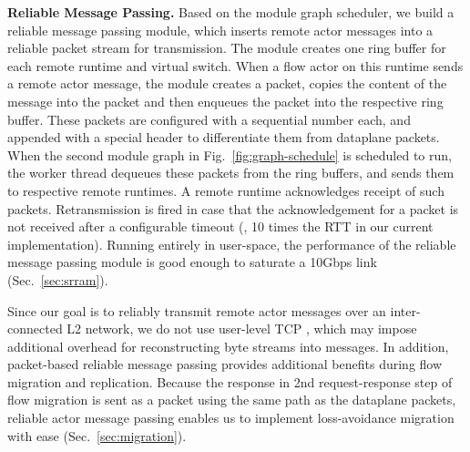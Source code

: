 \noindent \textbf{Reliable Message Passing.} Based on the module graph scheduler, we build a reliable message passing module, which inserts remote actor messages into a reliable packet stream for transmission. The module creates one ring buffer for each remote runtime and virtual switch. When a flow actor on this runtime sends a remote actor message, the module creates a packet, copies the content of the message into the packet and then enqueues the packet into the respective ring buffer. These packets are configured with a sequential number each, and appended with a special header to differentiate them from dataplane packets. When the second module graph in Fig.~\ref{fig:graph-schedule} is scheduled to run, the worker thread dequeues these packets from the ring buffers, and sends them to respective remote runtimes. A remote runtime acknowledges receipt of such packets. Retransmission is fired in case that the acknowledgement for a packet is not received after a configurable timeout (\eg, 10 times the RTT in our current implementation). Running entirely in user-space, the performance of the reliable message passing module is good enough to saturate a 10Gbps link (Sec.~\ref{sec:srram}).

Since our goal is to reliably transmit remote actor messages over an inter-connected L2 network, we do not use user-level TCP \cite{jeong2014mtcp}, which may impose additional overhead for reconstructing byte streams into messages. In addition, packet-based reliable message passing provides additional benefits during flow migration and replication. Because the response in 2nd request-response step of flow migration is sent as a packet using the same path as the dataplane packets, reliable actor message passing enables us to implement loss-avoidance migration with ease (Sec.~\ref{sec:migration}).



